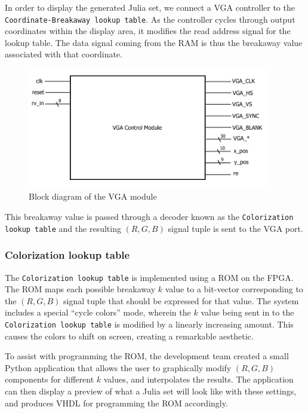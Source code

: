 \documentclass{article}
\begin{document}
In order to display the generated Julia set, we connect a VGA controller 
 to the \texttt{Coordinate-Breakaway lookup table}. As the controller cycles
through output coordinates within the display area, it modifies the
read address signal for the lookup table. The data signal coming from
the RAM is thus the breakaway value associated with that coordinate.

\begin{figure}[H]
  \centering
    \includegraphics[width=300pt]{block_diagrams/vga.pdf}
  \caption{Block diagram of the VGA module}
\end{figure}

This breakaway value is passed through a decoder known as the
\texttt{Colorization lookup table} and the resulting $(R, G, B)$ signal tuple
is sent to the VGA port.

\subsubsection{Colorization lookup table}
The \texttt{Colorization lookup table} is implemented using a ROM on the FPGA. The ROM maps each possible breakaway $k$ value to a bit-vector corresponding to the $(R, G, B)$ signal tuple that should be expressed for that value.
The system includes a special ``cycle colors'' mode, wherein the $k$ value being sent in to the \texttt{Colorization 
lookup table} is modified by a linearly increasing amount. This causes the colors to shift on screen, creating a 
remarkable aesthetic.

To assist with programming the ROM, the development team created a small Python application that allows the user
to graphically modify $(R, G, B)$ components for different $k$ values, and interpolates the results. The application 
can then display a preview of what a Julia set will look like with these settings, and produces VHDL for programming
the ROM accordingly.

\end{document}
